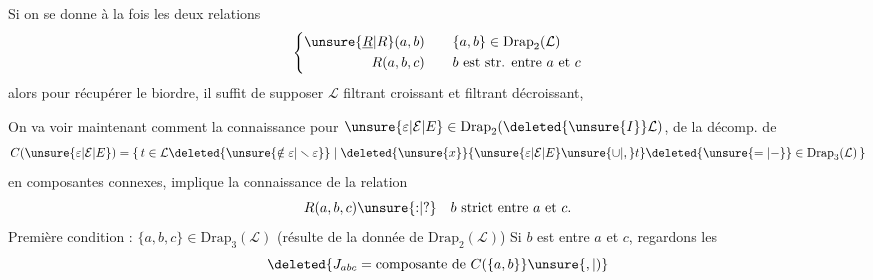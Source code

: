Si on se donne à la fois les deux relations
\[
\left\{\begin{aligned}
\unsure{\underline R|R}(a,b)&\qquad \{a,b\}\in\mathrm{Drap}_2(\mathcal L)\\
R(a,b,c)&\qquad b\text{ est str. entre }a\text{ et }c
\end{aligned}\right.
\]
alors pour récupérer le biordre, il suffit de supposer $\mathcal L$ filtrant croissant et filtrant décroissant,  

 On va voir maintenant comment la connaissance pour $\unsure{\varepsilon|\mathcal E|E}\in\mathrm{Drap}_2(\deleted{\unsure{I}}\mathcal L)$, de la décomp. de
\[
 C(\unsure{\varepsilon|\mathcal E|E})=\{\,t\in\mathcal L\deleted{\unsure{\notin\varepsilon|\smallsetminus\varepsilon}}\mid
 \deleted{\unsure{x}}\{\unsure{\varepsilon|\mathcal E|E}\unsure{\cup|,}t\}\deleted{\unsure{=|-}}\in\mathrm{Drap}_3(\mathcal L)\,\}
\]
en composantes connexes, implique la connaissance de la relation
\[
 R(a,b,c)\unsure{\mathord{:}|\mathord{?}}\quad b\text{ strict entre }a\text{ et }c.
\]
Première condition : $\{a,b,c\}\in\mathrm{Drap}_3(\mathcal L)$ (résulte de la donnée de $\mathrm{Drap}_2(\mathcal L)$)
Si $b$ est entre $a$ et $c$, regardons les
\[
 \deleted{J_{abc}=\text{composante de }C(\{a,b\}}\unsure{,|)}
\]

